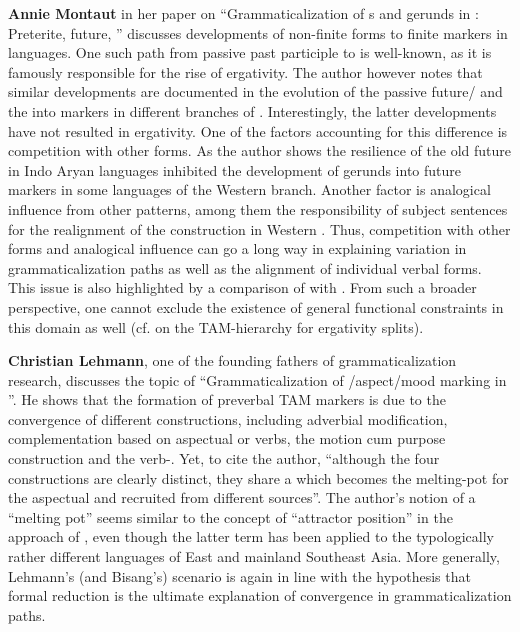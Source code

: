 \documentclass[output=paper]{LSP/langsci}
\begin{document}
\textbf{Annie Montaut} in her paper on “Grammaticalization of s and gerunds in : Preterite, future, ” discusses developments of non-finite forms to finite markers in  languages. One such path from passive past participle to  is well-known, as it is famously responsible for the rise of ergativity. The author however notes that similar developments are documented in the evolution of the passive future/  and the  into  markers in different branches of . Interestingly, the latter developments have not resulted in ergativity. One of the factors accounting for this difference is competition with other forms. As the author shows the resilience of the old future in Indo Aryan languages inhibited the development of gerunds into future markers in some languages of the Western branch. Another factor is analogical influence from other patterns, among them the responsibility of  subject sentences for the realignment of the  construction in Western . Thus, competition with other forms and analogical influence can go a long way in explaining variation in grammaticalization paths as well as the alignment of individual verbal forms. This issue is also highlighted by a comparison of  with . From such a broader perspective, one cannot exclude the existence of general functional constraints in this domain as well (cf. \citealt{Malchukov2011} on the TAM-hierarchy for ergativity splits). 

\largerpage\textbf{Christian Lehmann}, one of the founding fathers of grammaticalization research, discusses the topic of “Grammaticalization of /aspect/mood marking in  ”. He shows that the formation of preverbal TAM markers is due to the convergence of different constructions, including adverbial modification, complementation based on aspectual or  verbs, the motion cum purpose construction and the verb-. Yet, to cite the author, “although the four constructions are clearly distinct, they share a  which becomes the melting-pot for the aspectual and   recruited from different sources”. The author’s notion of a “melting pot” seems similar to the concept of “attractor position” in the approach of \citet{Bisang1992}, even though the latter term has been applied to the typologically rather different languages of East and mainland Southeast Asia. More generally, Lehmann’s (and Bisang’s) scenario is again in line with the hypothesis that formal reduction is the ultimate explanation of convergence in grammaticalization paths.
\end{document}
